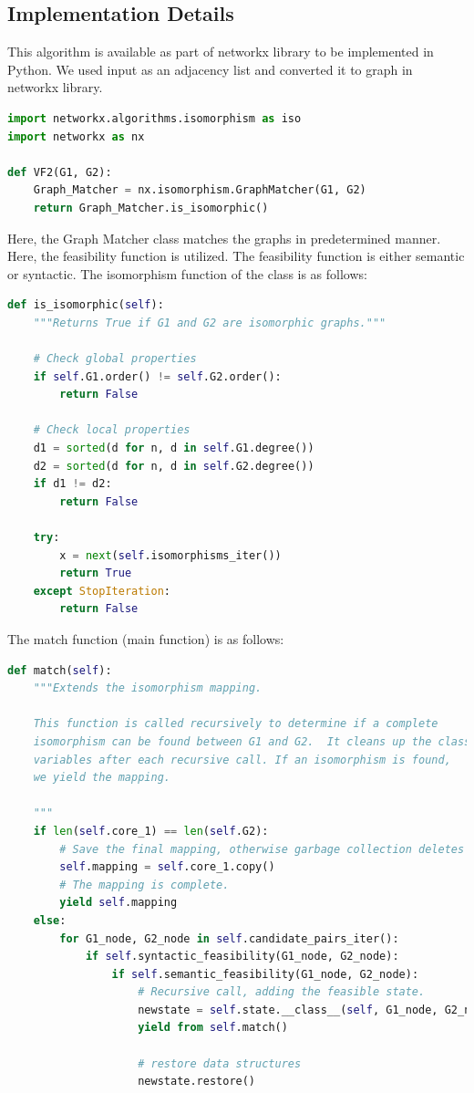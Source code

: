 \documentclass[11pt]{article}
\begin{document}
\subsection{Implementation Details}
\label{ssec:layout}
This algorithm is available as part of networkx library \cite{bruteGI} to be implemented in Python. We used input as an adjacency list and converted it to graph in networkx library. 
\begin{lstlisting}[language=Python]
import networkx.algorithms.isomorphism as iso
import networkx as nx

def VF2(G1, G2):
    Graph_Matcher = nx.isomorphism.GraphMatcher(G1, G2)
    return Graph_Matcher.is_isomorphic()
\end{lstlisting}
Here, the Graph Matcher class matches the graphs in predetermined manner. Here, the feasibility function is utilized. The feasibility function is either semantic or syntactic. The isomorphism function of the class is as follows:
\begin{lstlisting}[language=Python]
def is_isomorphic(self):
    """Returns True if G1 and G2 are isomorphic graphs."""

    # Check global properties
    if self.G1.order() != self.G2.order():
        return False

    # Check local properties
    d1 = sorted(d for n, d in self.G1.degree())
    d2 = sorted(d for n, d in self.G2.degree())
    if d1 != d2:
        return False

    try:
        x = next(self.isomorphisms_iter())
        return True
    except StopIteration:
        return False
\end{lstlisting}
The match function (main function) is as follows:
\begin{lstlisting}[language=Python]
def match(self):
    """Extends the isomorphism mapping.

    This function is called recursively to determine if a complete
    isomorphism can be found between G1 and G2.  It cleans up the class
    variables after each recursive call. If an isomorphism is found,
    we yield the mapping.

    """
    if len(self.core_1) == len(self.G2):
        # Save the final mapping, otherwise garbage collection deletes it.
        self.mapping = self.core_1.copy()
        # The mapping is complete.
        yield self.mapping
    else:
        for G1_node, G2_node in self.candidate_pairs_iter():
            if self.syntactic_feasibility(G1_node, G2_node):
                if self.semantic_feasibility(G1_node, G2_node):
                    # Recursive call, adding the feasible state.
                    newstate = self.state.__class__(self, G1_node, G2_node)
                    yield from self.match()

                    # restore data structures
                    newstate.restore()
\end{lstlisting}
\end{document}
